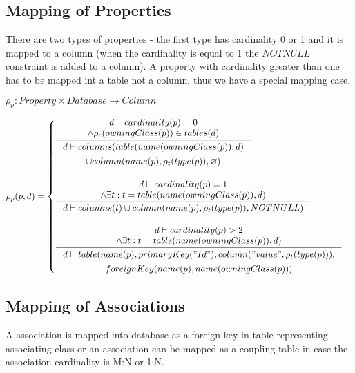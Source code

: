 \documentclass[11pt]{article}
\begin{document}
\subsection{Mapping of Properties}
There are two types of properties - the first type has cardinality 0 or 1 and it is mapped to a column (when the cardinality is equal to 1 the $NOTNULL$ constraint is added to a column). A property with cardinality greater than one has to be mapped int a table not a column, thus we have a special mapping case.



$
\rho_p : Property \times Database \rightarrow Column 
$

$\rho_p(p, d) = \begin{cases}
 \inference{d \vdash cardinality(p) = 0 \\ \wedge \rho_c(owningClass(p)) \in tables(d)}{\begin{gathered} d \vdash 
 columns(table(name(owningClass(p)),d) \\ \cup column(name(p), \rho_t(type(p)), \varnothing)
\end{gathered}
} \\ \\
 
 \inference{d \vdash cardinality(p) = 1 \\ \wedge \exists t : t = table(name(owningClass(p)), d)}{d \vdash columns(t) \cup column(name(p), \rho_t(type(p)), NOTNULL)} \\ \\
 
 \inference{d \vdash cardinality(p) > 2 \\ \wedge \exists t : t = table(name(owningClass(p)), d)}{\begin{gathered}d \vdash  table(name(p), primaryKey("Id"), column("value", \rho_t(type(p))), \\ foreignKey(name(p), name(owningClass(p))) \end{gathered}}
 \end{cases}$


\subsection{Mapping of Associations}
A association is mapped into database as a foreign key in table representing associating class or an association can be mapped as a coupling table in case the association cardinality is M:N or 1:N.
\end{document}
